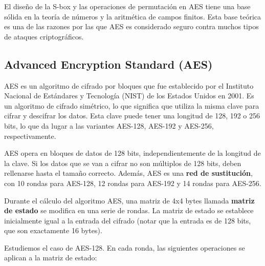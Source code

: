 El diseño de la S-box y las operaciones de permutación en AES tiene una base sólida en la teoría de números y la aritmética de campos finitos. Esta base teórica es una de las razones por las que AES es considerado seguro contra muchos tipos de ataques criptográficos.

\newpage

\subsection{Advanced Encryption Standard (AES)}
AES es un algoritmo de cifrado por bloques que fue establecido por el Instituto Nacional de Estándares y Tecnología (NIST) de los Estados Unidos en 2001. Es un algoritmo de cifrado simétrico, lo que significa que utiliza la misma clave para cifrar y descifrar los datos. Esta clave puede tener una longitud de 128, 192 o 256 bits, lo que da lugar a las variantes AES-128, AES-192 y AES-256, respectivamente. \medbreak

AES opera en bloques de datos de 128 bits, independientemente de la longitud de la clave. Si los datos que se van a cifrar no son múltiplos de 128 bits, deben rellenarse hasta el tamaño correcto. Además, AES es una \textbf{red de sustitución}, con 10 rondas para AES-128, 12 rondas para AES-192 y 14 rondas para AES-256. \medbreak

Durante el cálculo del algoritmo AES, una matriz de 4x4 bytes llamada \textbf{matriz de estado} se modifica en una serie de rondas. La matriz de estado se establece inicialmente igual a la entrada del cifrado (notar que la entrada es de 128 bits, que son exactamente 16 bytes). 

Estudiemos el caso de AES-128. En cada ronda, las siguientes operaciones se aplican a la matriz de estado:

